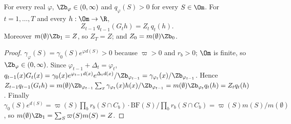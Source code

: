 \documentclass[11pt]{report}
\begin{document}
\begin{T12lemma}\label{T12:lem:bridge}
For every real $\varphi$, $\Zb_\varphi\in(0,\infty)$ and $q_\varphi(S)>0$ for every $S\in\Om$. For $t=1,\dots,T$ and every $h:\Om\to\R$,
\[ Z_{t-1}\,q_{t-1}(G_t h)=Z_t\,q_t(h). \]
Moreover $m(\emptyset)\Zb_1=Z$, so $Z_T=Z$; and $Z_0=m(\emptyset)\Zb_0$.
\end{T12lemma}
\begin{proof}
$\gamma_\varphi(S)=\gamma_0(S)e^{\varphi d(S)}>0$ because $\varpi>0$ and $r_b>0$; $\Om$ is finite, so $\Zb_\varphi\in(0,\infty)$. Since $\varphi_{t-1}+\Delta_t=\varphi_t$,
$q_{t-1}(x)G_t(x)=\gamma_0(x)e^{\varphi_{t-1}d(x)}e^{\Delta_t d(x)}/\Zb_{\varphi_{t-1}}=\gamma_{\varphi_t}(x)/\Zb_{\varphi_{t-1}}$. Hence
$Z_{t-1}q_{t-1}(G_th)=m(\emptyset)\Zb_{\varphi_{t-1}}\sum_x \gamma_{\varphi_t}(x)h(x)/\Zb_{\varphi_{t-1}}=m(\emptyset)\Zb_{\varphi_t}q_t(h)=Z_tq_t(h)$.
Finally $\gamma_0(S)e^{d(S)}=\varpi(S)\prod_b r_b(S\cap C_b)\cdot \mathrm{BF}(S)/\prod_b r_b(S\cap C_b)=\varpi(S)m(S)/m(\emptyset)$, so $m(\emptyset)\Zb_1=\sum_S\varpi(S)m(S)=Z$.
\end{proof}
\end{document}
